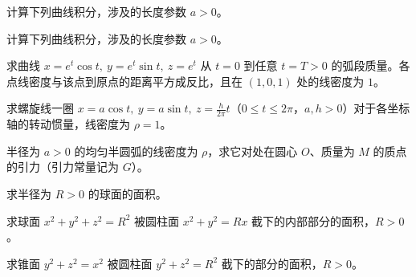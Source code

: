 \noindent\begin{minipage}{\textwidth}
计算下列曲线积分，涉及的长度参数 $a>0$。
\end{minipage}\par\vfill
\noindent\begin{minipage}{\textwidth}
计算下列曲线积分，涉及的长度参数 $a>0$。
\end{minipage}\par\vfill
\newpage
\noindent\begin{minipage}{\textwidth}
求曲线 $x=e^t\cos t,\ y=e^t\sin t,\ z=e^t$ 从 $t=0$ 到任意 $t=T>0$ 的弧段质量。各点线密度与该点到原点的距离平方成反比，且在 $(1,0,1)$ 处的线密度为 $1$。
\end{minipage}\par\vfill
\noindent\begin{minipage}{\textwidth}
求螺旋线一圈 $x=a\cos t,\ y=a\sin t,\ z=\frac{h}{2\pi}t$（$0\le t\le2\pi$，$a,h>0$）对于各坐标轴的转动惯量，线密度为 $\rho=1$。
\end{minipage}\par\vfill
\noindent\begin{minipage}{\textwidth}
半径为 $a>0$ 的均匀半圆弧的线密度为 $\rho$，求它对处在圆心 $O$、质量为 $M$ 的质点的引力（引力常量记为 $G$）。
\end{minipage}\par\vfill
\noindent\begin{minipage}{\textwidth}
求半径为 $R>0$ 的球面的面积。
\end{minipage}\par\vfill
\newpage
\noindent\begin{minipage}{\textwidth}
求球面 $x^2+y^2+z^2=R^2$ 被圆柱面 $x^2+y^2=Rx$ 截下的内部部分的面积，$R>0$。
\end{minipage}\par\vfill
\noindent\begin{minipage}{\textwidth}
求锥面 $y^2+z^2=x^2$ 被圆柱面 $y^2+z^2=R^2$ 截下的部分的面积，$R>0$。
\end{minipage}\par\vfill
